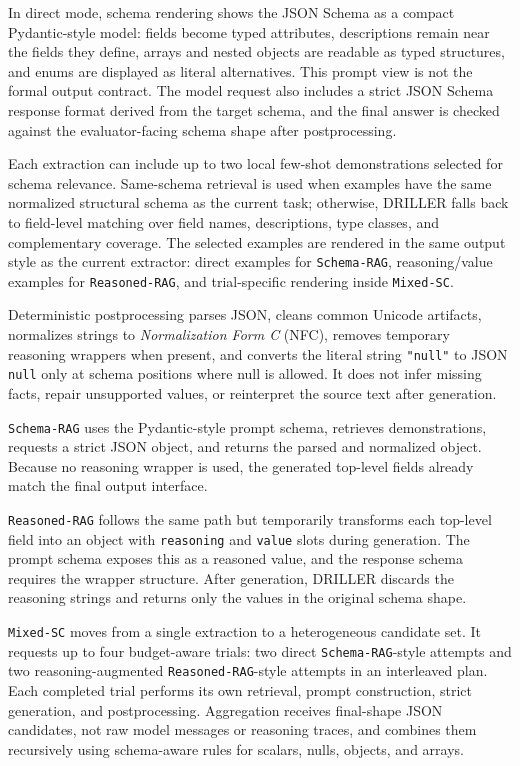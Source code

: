 In direct mode, schema rendering shows the JSON Schema as a compact Pydantic-style model: fields become typed attributes, descriptions remain near the fields they define, arrays and nested objects are readable as typed structures, and enums are displayed as literal alternatives. This prompt view is not the formal output contract. The model request also includes a strict JSON Schema response format derived from the target schema, and the final answer is checked against the evaluator-facing schema shape after postprocessing.

Each extraction can include up to two local few-shot demonstrations selected for schema relevance. Same-schema retrieval is used when examples have the same normalized structural schema as the current task; otherwise, DRILLER falls back to field-level matching over field names, descriptions, type classes, and complementary coverage. The selected examples are rendered in the same output style as the current extractor: direct examples for \texttt{Schema-RAG}, reasoning/value examples for \texttt{Reasoned-RAG}, and trial-specific rendering inside \texttt{Mixed-SC}.

Deterministic postprocessing parses JSON, cleans common Unicode artifacts, normalizes strings to \textit{Normalization Form C} (NFC), removes temporary reasoning wrappers when present, and converts the literal string \texttt{"null"} to JSON \texttt{null} only at schema positions where null is allowed. It does not infer missing facts, repair unsupported values, or reinterpret the source text after generation.

\texttt{Schema-RAG} uses the Pydantic-style prompt schema, retrieves demonstrations, requests a strict JSON object, and returns the parsed and normalized object. Because no reasoning wrapper is used, the generated top-level fields already match the final output interface.

\texttt{Reasoned-RAG} follows the same path but temporarily transforms each top-level field into an object with \texttt{reasoning} and \texttt{value} slots during generation. The prompt schema exposes this as a reasoned value, and the response schema requires the wrapper structure. After generation, DRILLER discards the reasoning strings and returns only the values in the original schema shape.

\texttt{Mixed-SC} moves from a single extraction to a heterogeneous candidate set. It requests up to four budget-aware trials: two direct \texttt{Schema-RAG}-style attempts and two reasoning-augmented \texttt{Reasoned-RAG}-style attempts in an interleaved plan. Each completed trial performs its own retrieval, prompt construction, strict generation, and postprocessing. Aggregation receives final-shape JSON candidates, not raw model messages or reasoning traces, and combines them recursively using schema-aware rules for scalars, nulls, objects, and arrays.
